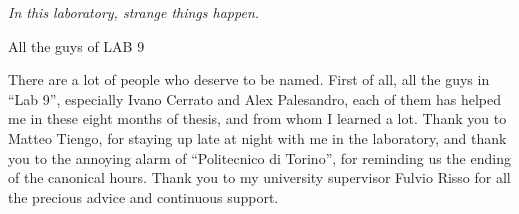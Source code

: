 \documentclass[12pt,classica, italian]{toptesi}
\begin{document}

\frontmatter
\begin{comment}
\vspace*{\stretch{1}}
\begin{flushright}
\noindent
grazie a tutti
\end{flushright}
\vspace*{\stretch{6}}
\cleardoublepage
\end{comment}
\begin{flushright}
\noindent


\textit{In this laboratory, strange things happen.}

All the guys of LAB 9
\end{flushright}
\cleardoublepage

%

\setcounter{secnumdepth}{4}
\setcounter{tocdepth}{3}
\newcommand{\servecitazione}[1]{\textcolor{blue}{\textbf{citare qualcosa : #1}}}
\newcommand{\needsrevision}[1] {\textcolor{green}{\textbf{needs revision: #1}}}
\newcommand{\matteo}[1] {\textcolor{green}{\textbf{Matteo: #1}}}
\newcommand{\matteodubbio}[1] {\textcolor{red}{\textbf{questa Matteo non l'ha capita "#1"}}}
\newcommand{\fabiodubbio}[1] {\textcolor{red}{\textbf{Fabio non riesce a capire perche' ha scritto queste vaccate "#1"}}}
\newcommand{\imageneeded}[1] {\textcolor{blue}{\textbf{Image is needed "#1"}}}
\newcommand{\fabio}[1] {\textcolor{green}{\textbf{Fabio: #1}}}


\ringraziamenti
There are a lot of people who deserve to be named. First of all, all the guys in ``Lab 9'', especially Ivano Cerrato and Alex Palesandro, each of them has helped me in these eight months of thesis, and from whom I learned a lot. Thank you to Matteo Tiengo, for staying up late at night with me in the laboratory, and thank you to the annoying alarm of ``Politecnico di Torino'', for reminding us the ending of the canonical hours. Thank you to my university supervisor Fulvio Risso for all the precious advice and continuous support. 
\end{document}
